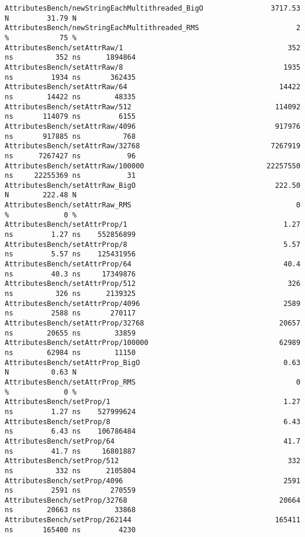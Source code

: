 \begin{code}
\begin{verbatim}
AttributesBench/newStringEachMultithreaded_BigO                3717.53 N         31.79 N
AttributesBench/newStringEachMultithreaded_RMS                       2 %            75 %
AttributesBench/setAttrRaw/1                                       352 ns          352 ns      1894864
AttributesBench/setAttrRaw/8                                      1935 ns         1934 ns       362435
AttributesBench/setAttrRaw/64                                    14422 ns        14422 ns        48335
AttributesBench/setAttrRaw/512                                  114092 ns       114079 ns         6155
AttributesBench/setAttrRaw/4096                                 917976 ns       917885 ns          768
AttributesBench/setAttrRaw/32768                               7267919 ns      7267427 ns           96
AttributesBench/setAttrRaw/100000                             22257550 ns     22255369 ns           31
AttributesBench/setAttrRaw_BigO                                 222.50 N        222.48 N
AttributesBench/setAttrRaw_RMS                                       0 %             0 %
AttributesBench/setAttrProp/1                                     1.27 ns         1.27 ns    552856899
AttributesBench/setAttrProp/8                                     5.57 ns         5.57 ns    125431956
AttributesBench/setAttrProp/64                                    40.4 ns         40.3 ns     17349876
AttributesBench/setAttrProp/512                                    326 ns          326 ns      2139325
AttributesBench/setAttrProp/4096                                  2589 ns         2588 ns       270117
AttributesBench/setAttrProp/32768                                20657 ns        20655 ns        33859
AttributesBench/setAttrProp/100000                               62989 ns        62984 ns        11150
AttributesBench/setAttrProp_BigO                                  0.63 N          0.63 N
AttributesBench/setAttrProp_RMS                                      0 %             0 %
AttributesBench/setProp/1                                         1.27 ns         1.27 ns    527999624
AttributesBench/setProp/8                                         6.43 ns         6.43 ns    106786484
AttributesBench/setProp/64                                        41.7 ns         41.7 ns     16801887
AttributesBench/setProp/512                                        332 ns          332 ns      2105804
AttributesBench/setProp/4096                                      2591 ns         2591 ns       270559
AttributesBench/setProp/32768                                    20664 ns        20663 ns        33868
AttributesBench/setProp/262144                                  165411 ns       165400 ns         4230

\end{verbatim}
\end{code}
